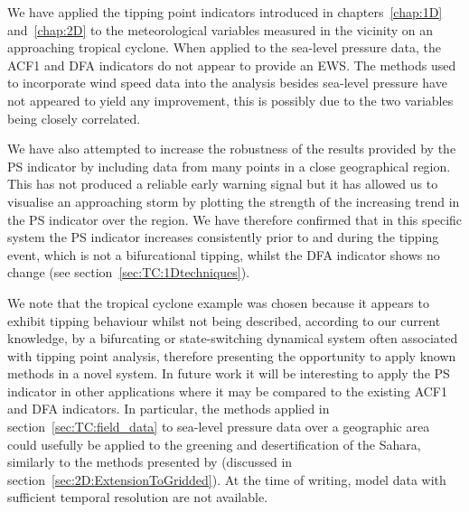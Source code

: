 We have applied the tipping point indicators introduced in chapters~\ref{chap:1D} and~\ref{chap:2D} to the meteorological variables measured in the vicinity on an approaching tropical cyclone. When applied to the sea-level pressure data, the ACF1 and DFA indicators do not appear to provide an EWS. {} The methods used to incorporate wind speed data into the analysis besides sea-level pressure have not appeared to yield any improvement, this is possibly due to the two variables being closely correlated. 

We have also attempted to increase the robustness of the results provided by the PS indicator by including data from many points in a close geographical region. This has not produced a reliable early warning signal but it has allowed us to visualise an approaching storm by plotting the strength of the increasing trend in the PS indicator over the region. We have therefore confirmed that in this specific system the PS indicator increases consistently prior to and during the tipping event, which is not a bifurcational tipping, whilst the DFA indicator shows no change (see section~\ref{sec:TC:1Dtechniques}). {}

We note that the tropical cyclone example was chosen because it appears to exhibit tipping behaviour whilst not being described, according to our current knowledge, by a bifurcating or state-switching dynamical system often associated with tipping point analysis, therefore presenting the opportunity to apply known methods in a novel system. In future work it will be interesting to apply the PS indicator in other applications where it may be compared to the existing ACF1 and DFA indicators. In particular, the methods applied in section~\ref{sec:TC:field_data} to sea-level pressure data over a geographic area could usefully be applied to the greening and desertification of the Sahara, similarly to the methods presented by \citet{bathiany2013p1} (discussed in section~\ref{sec:2D:ExtensionToGridded}). At the time of writing, model data with sufficient temporal resolution are not available.  

